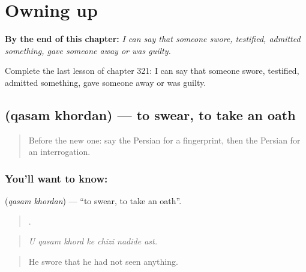 
\chapter{Owning up}
\label{ch:fa-owning-up}

\begin{chapteropening}
\textbf{By the end of this chapter:} \emph{I can say that someone swore, testified, admitted something, gave someone away or was guilty.}

Complete the last lesson of chapter 321: I can say that someone swore, testified, admitted something, gave someone away or was guilty.
\end{chapteropening}

\section[\texorpdfstring{\fa{قسم} \fa{خوردن} (qasam khordan)}{قسم خوردن (qasam khordan)}]{  (qasam khordan) — to swear, to take an oath}

\label{lesson:FA-C321-qasam-khordan}



\begin{quote}
Before the new one: say the Persian for a fingerprint, then the Persian for an interrogation.
\end{quote}

\subsection*{You'll want to know:  }
\textbf{ } (\emph{qasam khordan}) — \textquotedblleft{}to swear, to take an oath\textquotedblright{}.

\begin{quote}
      .
\end{quote}

\begin{quote}
\emph{U qasam khord ke chizi nadide ast.}
\end{quote}

\begin{quote}
He swore that he had not seen anything.
\end{quote}

